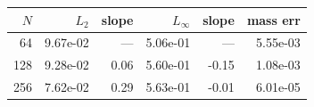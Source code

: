 \begin{tabular}{rrrrrr}
\toprule
$N$ & $L_2$ & slope & $L_\infty$ & slope & mass err \\
\midrule
64 & 9.67e-02 & --- & 5.06e-01 & --- & 5.55e-03 \\
128 & 9.28e-02 & 0.06 & 5.60e-01 & -0.15 & 1.08e-03 \\
256 & 7.62e-02 & 0.29 & 5.63e-01 & -0.01 & 6.01e-05 \\
\bottomrule
\end{tabular}
